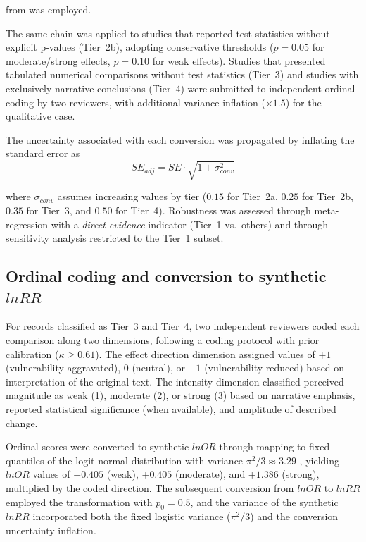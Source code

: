 \documentclass[12pt,a4paper]{article}
\begin{document}
\noindent from \citet{Lajeunesse2011} was employed.

The same chain was applied to studies that reported test statistics without explicit p-values (Tier~2b), adopting conservative thresholds ($p = 0.05$ for moderate/strong effects, $p = 0.10$ for weak effects). Studies that presented tabulated numerical comparisons without test statistics (Tier~3) and studies with exclusively narrative conclusions (Tier~4) were submitted to independent ordinal coding by two reviewers, with additional variance inflation ($\times 1.5$) for the qualitative case.

The uncertainty associated with each conversion was propagated by inflating the standard error as
%
\begin{equation}
SE_{adj} = SE \cdot \sqrt{1 + \sigma^2_{conv}}
\label{eq:se-adj}
\end{equation}

\noindent where $\sigma_{conv}$ assumes increasing values by tier ($0.15$ for Tier~2a, $0.25$ for Tier~2b, $0.35$ for Tier~3, and $0.50$ for Tier~4). Robustness was assessed through meta-regression with a \textit{direct evidence} indicator (Tier~1 vs.\ others) and through sensitivity analysis restricted to the Tier~1 subset.

\subsection{Ordinal coding and conversion to synthetic \texorpdfstring{$lnRR$}{lnRR}}
\label{sec:coding}

For records classified as Tier~3 and Tier~4, two independent reviewers coded each comparison along two dimensions, following a coding protocol with prior calibration ($\kappa \geq 0.61$). The effect direction dimension assigned values of $+1$ (vulnerability aggravated), $0$ (neutral), or $-1$ (vulnerability reduced) based on interpretation of the original text. The intensity dimension classified perceived magnitude as weak (1), moderate (2), or strong (3) based on narrative emphasis, reported statistical significance (when available), and amplitude of described change.

Ordinal scores were converted to synthetic $lnOR$ through mapping to fixed quantiles of the logit-normal distribution with variance $\pi^2/3 \approx 3.29$ \citep{Hasselblad1995}, yielding $lnOR$ values of $-0.405$ (weak), $+0.405$ (moderate), and $+1.386$ (strong), multiplied by the coded direction. The subsequent conversion from $lnOR$ to $lnRR$ employed the \citet{Zhang1998} transformation with $p_0 = 0.5$, and the variance of the synthetic $lnRR$ incorporated both the fixed logistic variance ($\pi^2/3$) and the conversion uncertainty inflation.
\end{document}
